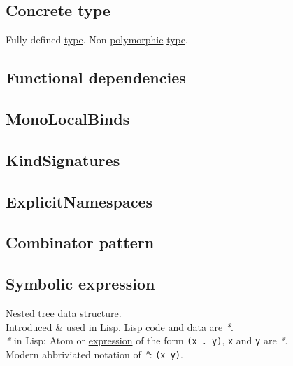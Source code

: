 \documentclass[11pt]{article}
\begin{document}
\subsection{\label{org4c80d0b}Concrete type}
\label{sec:org2a9296e}
Fully defined \hyperref[org4fbaeb8]{type}. Non-\hyperref[org84d7fee]{polymorphic} \hyperref[org4fbaeb8]{type}.\\

\subsection{\label{org62d1f62}Functional dependencies}
\label{sec:org9cbf4cd}

\subsection{\label{org22b0332}MonoLocalBinds}
\label{sec:org1aa58fe}

\subsection{\label{orgd5834af}KindSignatures}
\label{sec:orgc0444bd}

\subsection{\label{orgd6a7800}ExplicitNamespaces}
\label{sec:org21ae34e}

\subsection{\label{org8d112d2}Combinator pattern}
\label{sec:org3b1219f}

\subsection{\label{org0ba9c4b}Symbolic expression}
\label{sec:org31bd9c4}
Nested tree \hyperref[org47669ca]{data structure}.\\

Introduced \& used in Lisp. Lisp code and data are \emph{*}.\\

\emph{*} in Lisp: Atom or \hyperref[org667db83]{expression} of the form \texttt{(x . y)}, \texttt{x} and \texttt{y} are \emph{*}.\\

Modern abbriviated notation of \emph{*}: \texttt{(x y)}.\\
\end{document}
